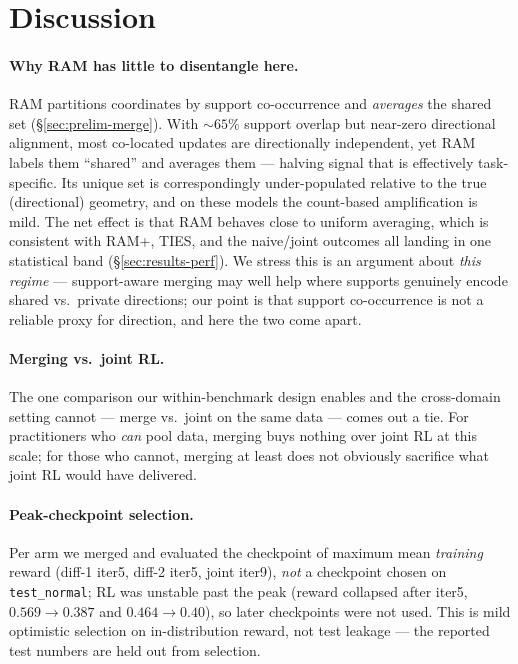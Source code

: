 \documentclass[11pt]{article}
\begin{document}
\section{Discussion}
\label{sec:discussion}

\paragraph{Why RAM has little to disentangle here.} RAM partitions coordinates by support
co-occurrence and \emph{averages} the shared set (\S\ref{sec:prelim-merge}). With
$\sim\!65\%$ support overlap but near-zero directional alignment, most co-located updates
are directionally independent, yet RAM labels them ``shared'' and averages them --- halving
signal that is effectively task-specific. Its unique set is correspondingly
under-populated relative to the true (directional) geometry, and on these models the
count-based amplification is mild. The net effect is that RAM behaves close to uniform
averaging, which is consistent with RAM+, TIES, and the naive/joint outcomes all landing
in one statistical band (\S\ref{sec:results-perf}). We stress this is an argument about
\emph{this regime} --- support-aware merging may well help where supports genuinely encode
shared vs.\ private directions; our point is that support co-occurrence is not a reliable
proxy for direction, and here the two come apart.

\paragraph{Merging vs.\ joint RL.} The one comparison our within-benchmark design enables
and the cross-domain setting cannot --- merge vs.\ joint on the same data --- comes out a
tie. For practitioners who \emph{can} pool data, merging buys nothing over joint RL at this
scale; for those who cannot, merging at least does not obviously sacrifice what joint RL
would have delivered.

\paragraph{Peak-checkpoint selection.} Per arm we merged and evaluated the checkpoint of
maximum mean \emph{training} reward (diff-1 iter5, diff-2 iter5, joint iter9), \emph{not}
a checkpoint chosen on \texttt{test\_normal}; RL was unstable past the peak (reward
collapsed after iter5, $0.569\!\to\!0.387$ and $0.464\!\to\!0.40$), so later checkpoints
were not used. This is mild optimistic selection on in-distribution reward, not test
leakage --- the reported test numbers are held out from selection.
\end{document}
